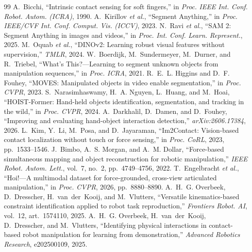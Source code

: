 \documentclass[letterpaper,10pt,journal,twoside]{IEEEtran}
\begin{document}
\begin{thebibliography}{99}
 A.~Bicchi, ``Intrinsic contact sensing for soft fingers,''
in \emph{Proc. IEEE Int. Conf. Robot. Autom. (ICRA)}, 1990.
 A.~Kirillov \emph{et al.}, ``Segment Anything,'' in
\emph{Proc. IEEE/CVF Int. Conf. Comput. Vis. (ICCV)}, 2023.
 N.~Ravi \emph{et al.}, ``SAM 2: Segment Anything in
images and videos,'' in \emph{Proc. Int. Conf. Learn. Represent.}, 2025.
 M.~Oquab \emph{et al.}, ``DINOv2: Learning robust
visual features without supervision,'' \emph{TMLR}, 2024.
 W.~Boerdijk, M.~Sundermeyer, M.~Durner, and
R.~Triebel, ``What's This?---Learning to segment unknown objects from
manipulation sequences,'' in \emph{Proc. ICRA}, 2021.
 R.~E.~L. Higgins and D.~F. Fouhey, ``MOVES:
Manipulated objects in video enable segmentation,'' in \emph{Proc. CVPR}, 2023.
 S.~Narasimhaswamy, H.~A. Nguyen, L.~Huang,
and M.~Hoai, ``HOIST-Former: Hand-held objects identification, segmentation,
and tracking in the wild,'' in \emph{Proc. CVPR}, 2024.
 A.~Darkhalil, D.~Damen, and D.~Fouhey, ``Improving
and evaluating hand-object interaction detection,'' \emph{arXiv:2606.17384},
2026.
 L.~Kim, Y.~Li, M.~Posa, and D.~Jayaraman,
``Im2Contact: Vision-based contact localization without touch or force
sensing,'' in \emph{Proc. CoRL}, 2023, pp.~1533--1546.
 J.~Bimbo, A.~S. Morgan, and A.~M. Dollar,
``Force-based simultaneous mapping and object reconstruction for robotic
manipulation,'' \emph{IEEE Robot. Autom. Lett.}, vol.~7, no.~2,
pp.~4749--4756, 2022.
 T.~Engelbracht \emph{et al.}, ``Hoi!---A
multimodal dataset for force-grounded, cross-view articulated manipulation,''
in \emph{Proc. CVPR}, 2026, pp.~8880--8890.
 A.~H.~G. Overbeek, D.~Dresscher,
H.~van~der~Kooij, and M.~Vlutters, ``Versatile kinematics-based constraint
identification applied to robot task reproduction,'' \emph{Frontiers Robot.
AI}, vol.~12, art.~1574110, 2025.
 A.~H.~G. Overbeek, H.~van~der~Kooij, D.~Dresscher,
and M.~Vlutters, ``Identifying physical interactions in contact-based robot
manipulation for learning from demonstration,'' \emph{Advanced Robotics
Research}, e202500109, 2025.
\end{thebibliography}
\end{document}
